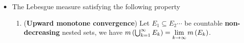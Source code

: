 \documentclass[11pt]{article}
\begin{document}
\begin{itemize}
\begin{proof}
\begin{itemize}
Finally, let $U= \paren{\bigcup_{k=1}^{\infty}B_{k}}\cup V\supset E$ be the open set we need. Hence
\begin{align}
U \setminus U_{\epsilon} &= \paren{\bigcup_{k=1}^{\infty}B_{k}}\cup V  \setminus  \paren{\bigcup_{k=1}^{\infty}Q'_{k}}\cup\paren{U_{\epsilon} \setminus  \bigcup_{k=1}^{\infty}Q'_{k}}\nonumber\\
&\subset \brac{ \paren{\bigcup_{k=1}^{\infty}B_{k}}  \setminus  \paren{\bigcup_{k=1}^{\infty}Q'_{k}}}\cup V^{*}\nonumber\\
&\subset \paren{\bigcup_{k=1}^{\infty}\brac{B_{k} \setminus  Q'_{k}}}\cup V^{*};\nonumber\\
m^{*}(U \setminus U_{\epsilon})&\le \sum_{k=1}^{\infty}m^{*}(B_{k} \setminus  Q'_{k})+ m^{*}(V^{*})\nonumber\\
&\le \sum_{k=1}^{\infty}\frac{1}{6}\frac{\epsilon}{2^{k}} + \frac{1}{6}\epsilon \nonumber\\
&= \frac{1}{3}\epsilon \label{eqn: mearability_lemma_3}
\end{align}
where $V^{*}= V\cup \paren{U_{\epsilon} \setminus  \bigcup_{k=1}^{\infty}Q'_{k}}$ is a null set with outer measure 
\begin{align*}
m^{*}(V^{*})&\le m^{*}(V)+ m^{*}( U_{\epsilon} \setminus  E_{\epsilon})\\
&\le \frac{1}{12}\epsilon + \frac{1}{12}\epsilon = \frac{1}{6}\epsilon
\end{align*}
Note that $\paren{U_{\epsilon} \setminus  \bigcup_{k=1}^{\infty}Q'_{k}} \subset U_{\epsilon} \setminus  E_{\epsilon}$ and $m^{*}(U_{\epsilon} \setminus  E_{\epsilon}) \le \epsilon/12$, so $\paren{U_{\epsilon} \setminus  \bigcup_{k=1}^{\infty}Q'_{k}}$ is a null set. 

Substituting \eqref{eqn: mearability_lemma_3}, and \eqref{eqn: mearability_lemma_2} into \eqref{eqn: mearability_lemma_1}, we have $m^{*}(U \setminus E) \le \epsilon$, which completes our proof.  \qed
\end{itemize}
\end{proof}

\item \begin{proposition}
The Lebesgue measure satisfying the following property
\begin{enumerate}
\item (\textbf{Upward monotone convergence}) Let $E_{1}\subseteq E_{2} \cdots $ be countable \textbf{non-decreasing} nested sets, we have 
$m\left(\bigcup_{k=1}^{\infty}E_{k}\right) = \lim\limits_{k\rightarrow \infty}m\left(E_{k}\right)$.


\end{enumerate}
\end{proposition}
\end{itemize}
\end{document}
